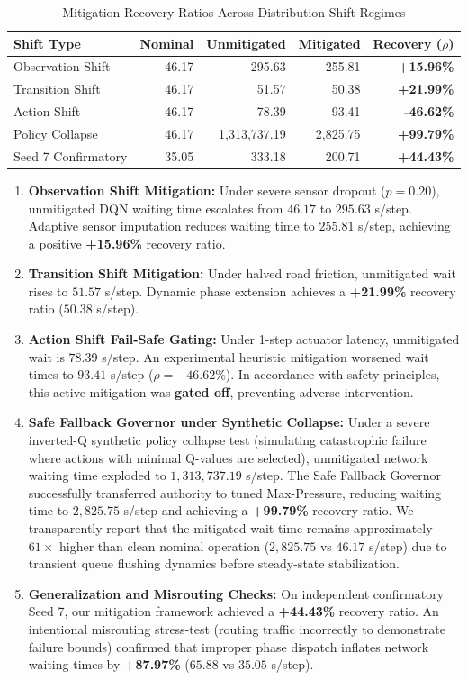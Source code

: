 \documentclass{ieeeaccess}
\begin{document}
\begin{table}[!t]
\centering
\caption{Mitigation Recovery Ratios Across Distribution Shift Regimes}
\label{tab:mitigation}
\scriptsize
\setlength{\tabcolsep}{2.5pt}
\begin{tabular}{lrrrr}
\toprule
\textbf{Shift Type} & \textbf{Nominal} & \textbf{Unmitigated} & \textbf{Mitigated} & \textbf{Recovery ($\rho$)} \\
\midrule
Observation Shift & 46.17 & 295.63 & 255.81 & \textbf{+15.96\%} \\
Transition Shift & 46.17 & 51.57 & 50.38 & \textbf{+21.99\%} \\
Action Shift & 46.17 & 78.39 & 93.41 & \textbf{-46.62\%} \\
Policy Collapse & 46.17 & 1,313,737.19 & 2,825.75 & \textbf{+99.79\%} \\
\midrule
Seed 7 Confirmatory & 35.05 & 333.18 & 200.71 & \textbf{+44.43\%} \\
\bottomrule
\end{tabular}
\end{table}

\begin{enumerate}
    \item \textbf{Observation Shift Mitigation:} Under severe sensor dropout ($p=0.20$), unmitigated DQN waiting time escalates from $46.17$ to $295.63$ s/step. Adaptive sensor imputation reduces waiting time to $255.81$ s/step, achieving a positive \textbf{+15.96\%} recovery ratio.
    \item \textbf{Transition Shift Mitigation:} Under halved road friction, unmitigated wait rises to $51.57$ s/step. Dynamic phase extension achieves a \textbf{+21.99\%} recovery ratio ($50.38$ s/step).
    \item \textbf{Action Shift Fail-Safe Gating:} Under 1-step actuator latency, unmitigated wait is $78.39$ s/step. An experimental heuristic mitigation worsened wait times to $93.41$ s/step ($\rho = -46.62\%$). In accordance with safety principles, this active mitigation was \textbf{gated off}, preventing adverse intervention.
    \item \textbf{Safe Fallback Governor under Synthetic Collapse:} Under a severe inverted-Q synthetic policy collapse test (simulating catastrophic failure where actions with minimal Q-values are selected), unmitigated network waiting time exploded to $1,313,737.19$ s/step. The Safe Fallback Governor successfully transferred authority to tuned Max-Pressure, reducing waiting time to $2,825.75$ s/step and achieving a \textbf{+99.79\%} recovery ratio. We transparently report that the mitigated wait time remains approximately $61\times$ higher than clean nominal operation ($2,825.75$ vs $46.17$ s/step) due to transient queue flushing dynamics before steady-state stabilization.
    \item \textbf{Generalization and Misrouting Checks:} On independent confirmatory Seed 7, our mitigation framework achieved a \textbf{+44.43\%} recovery ratio. An intentional misrouting stress-test (routing traffic incorrectly to demonstrate failure bounds) confirmed that improper phase dispatch inflates network waiting times by \textbf{+87.97\%} ($65.88$ vs $35.05$ s/step).
\end{enumerate}
\end{document}
